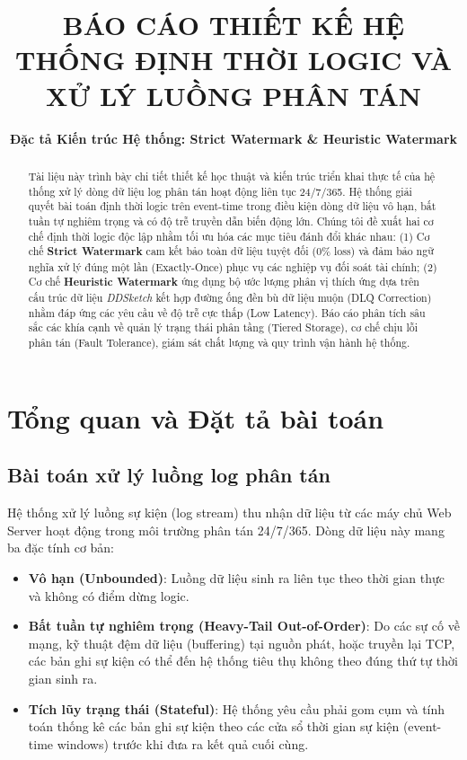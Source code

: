 \documentclass[12pt,a4paper]{article}
\title{\textbf{BÁO CÁO THIẾT KẾ HỆ THỐNG ĐỊNH THỜI LOGIC VÀ XỬ LÝ LUỒNG PHÂN TÁN}}
\author{\textbf{Đặc tả Kiến trúc Hệ thống: Strict Watermark \& Heuristic Watermark}}
\date{}
\begin{document}
\maketitle

\begin{abstract}
Tài liệu này trình bày chi tiết thiết kế học thuật và kiến trúc triển khai thực tế của hệ thống xử lý dòng dữ liệu log phân tán hoạt động liên tục 24/7/365. Hệ thống giải quyết bài toán định thời logic trên event-time trong điều kiện dòng dữ liệu vô hạn, bất tuần tự nghiêm trọng và có độ trễ truyền dẫn biến động lớn. Chúng tôi đề xuất hai cơ chế định thời logic độc lập nhằm tối ưu hóa các mục tiêu đánh đổi khác nhau: (1) Cơ chế \textbf{Strict Watermark} cam kết bảo toàn dữ liệu tuyệt đối (0\% loss) và đảm bảo ngữ nghĩa xử lý đúng một lần (Exactly-Once) phục vụ các nghiệp vụ đối soát tài chính; (2) Cơ chế \textbf{Heuristic Watermark} ứng dụng bộ ước lượng phân vị thích ứng dựa trên cấu trúc dữ liệu \textit{DDSketch} kết hợp đường ống đền bù dữ liệu muộn (DLQ Correction) nhằm đáp ứng các yêu cầu về độ trễ cực thấp (Low Latency). Báo cáo phân tích sâu sắc các khía cạnh về quản lý trạng thái phân tầng (Tiered Storage), cơ chế chịu lỗi phân tán (Fault Tolerance), giám sát chất lượng và quy trình vận hành hệ thống.
\end{abstract}

\newpage
\tableofcontents
\newpage

\section{Tổng quan và Đặt tả bài toán}

\subsection{Bài toán xử lý luồng log phân tán}
Hệ thống xử lý luồng sự kiện (log stream) thu nhận dữ liệu từ các máy chủ Web Server hoạt động trong môi trường phân tán 24/7/365. Dòng dữ liệu này mang ba đặc tính cơ bản:
\begin{itemize}
    \item \textbf{Vô hạn (Unbounded)}: Luồng dữ liệu sinh ra liên tục theo thời gian thực và không có điểm dừng logic.
    \item \textbf{Bất tuần tự nghiêm trọng (Heavy-Tail Out-of-Order)}: Do các sự cố về mạng, kỹ thuật đệm dữ liệu (buffering) tại nguồn phát, hoặc truyền lại TCP, các bản ghi sự kiện có thể đến hệ thống tiêu thụ không theo đúng thứ tự thời gian sinh ra.
    \item \textbf{Tích lũy trạng thái (Stateful)}: Hệ thống yêu cầu phải gom cụm và tính toán thống kê các bản ghi sự kiện theo các cửa sổ thời gian sự kiện (event-time windows) trước khi đưa ra kết quả cuối cùng.
\end{itemize}
\end{document}

